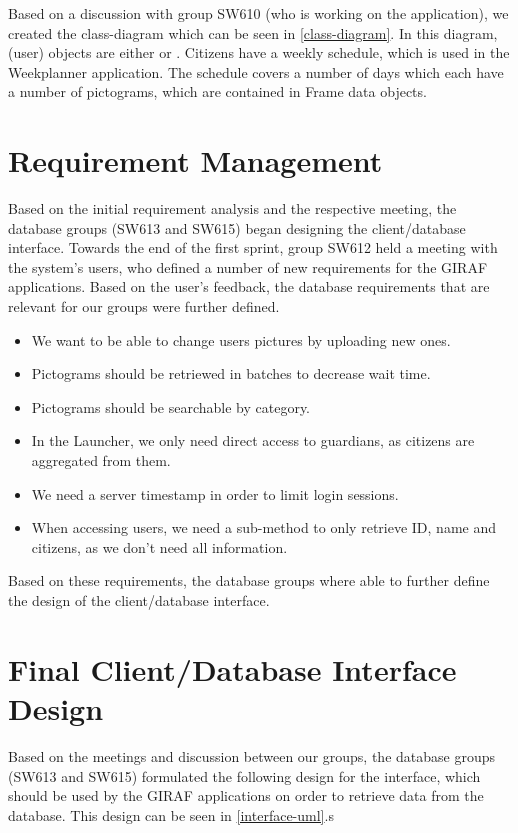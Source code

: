 Based on a discussion with group SW610 (who is working on the
 application), we created the class-diagram which can be seen
in \autoref{class-diagram}. In this diagram,  (user) objects are
either  or . Citizens have a weekly schedule,
which is used in the Weekplanner application. The schedule covers a number of
days which each have a number of pictograms, which are contained in Frame
data objects.


\section{Requirement Management}
Based on the initial requirement analysis and the respective meeting, the
database groups (SW613 and SW615) began designing the client/database interface.
Towards the end of the first sprint, group SW612 held a meeting with the
system's users, who defined a number of new requirements for the GIRAF
applications. Based on the user's feedback, the database requirements that are
relevant for our groups were further defined.

\begin{itemize}
  \item We want to be able to change users pictures by uploading new ones.
  \item Pictograms should be retriewed in batches to decrease wait time.
  \item Pictograms should be searchable by category.
  \item In the Launcher, we only need direct access to guardians, as citizens
  are aggregated from them.
  \item We need a server timestamp in order to limit login sessions.
  \item When accessing users, we need a sub-method to only retrieve ID, name and
  citizens, as we don't need all information.
\end{itemize}

Based on these requirements, the database groups where able to further define
the design of the client/database interface.

\section{Final Client/Database Interface Design}
Based on the meetings and discussion between our groups, the database groups
(SW613 and SW615) formulated the following design for the interface, which
should be used by the GIRAF applications on order to retrieve data from the
database. This design can be seen in \autoref{interface-uml}.s

